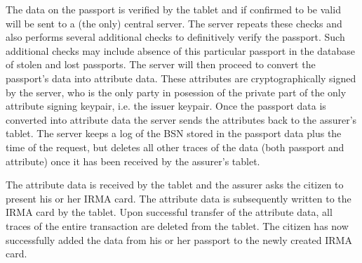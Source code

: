 The data on the passport is verified by the tablet and if confirmed to be valid will be sent to a (the only) central server. The server repeats these checks and also performs several additional checks to definitively verify the passport. Such additional checks may include absence of this particular passport in the database of stolen and lost passports. The server will then proceed to convert the passport's data into attribute data. These attributes are cryptographically signed by the server, who is the only party in posession of the private part of the only attribute signing keypair, i.e. the issuer keypair. Once the passport data is converted into attribute data the server sends the attributes back to the assurer's tablet. The server keeps a log of the BSN stored in the passport data plus the time of the request, but deletes all other traces of the data (both passport and attribute) once it has been received by the assurer's tablet. 

The attribute data is received by the tablet and the assurer asks the citizen to present his or her IRMA card. The attribute data is subsequently written to the IRMA card by the tablet. Upon successful transfer of the attribute data, all traces of the entire transaction are deleted from the tablet. The citizen has now successfully added the data from his or her passport to the newly created IRMA card.

